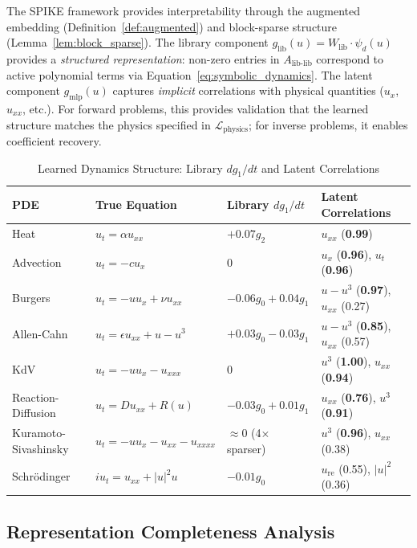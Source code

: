 \documentclass{article}
\theoremstyle{remark}
\begin{document}
The SPIKE framework provides interpretability through the augmented embedding (Definition~\ref{def:augmented}) and block-sparse structure (Lemma~\ref{lem:block_sparse}). The library component $g_{\text{lib}}(u) = W_{\text{lib}} \cdot \psi_d(u)$ provides a \textit{structured representation}: non-zero entries in $A_{\text{lib-lib}}$ correspond to active polynomial terms via Equation~\ref{eq:symbolic_dynamics}. The latent component $g_{\text{mlp}}(u)$ captures \textit{implicit} correlations with physical quantities ($u_x$, $u_{xx}$, etc.). For forward problems, this provides validation that the learned structure matches the physics specified in $\mathcal{L}_{\text{physics}}$; for inverse problems, it enables coefficient recovery.

\begin{table}[H]
\centering
\caption{Learned Dynamics Structure: Library $dg_1/dt$ and Latent Correlations}
\label{tab:learned_dynamics}
\begin{tabular}{llll}
\toprule
PDE & True Equation & Library $dg_1/dt$ & Latent Correlations \\
\midrule
Heat & $u_t = \alpha u_{xx}$ & $+0.07g_2$ & $u_{xx}$ (\textbf{0.99}) \\
Advection & $u_t = -c u_x$ & $0$ & $u_x$ (\textbf{0.96}), $u_t$ (\textbf{0.96}) \\
Burgers & $u_t = -uu_x + \nu u_{xx}$ & $-0.06g_0 + 0.04g_1$ & $u - u^3$ (\textbf{0.97}), $u_{xx}$ (0.27) \\
Allen-Cahn & $u_t = \epsilon u_{xx} + u - u^3$ & $+0.03g_0 - 0.03g_1$ & $u - u^3$ (\textbf{0.85}), $u_{xx}$ (0.57) \\
KdV & $u_t = -uu_x - u_{xxx}$ & $0$ & $u^3$ (\textbf{1.00}), $u_{xx}$ (\textbf{0.94}) \\
Reaction-Diffusion & $u_t = Du_{xx} + R(u)$ & $-0.03g_0 + 0.01g_1$ & $u_{xx}$ (\textbf{0.76}), $u^3$ (\textbf{0.91}) \\
Kuramoto-Sivashinsky & $u_t = -uu_x - u_{xx} - u_{xxxx}$ & $\approx 0$ (4$\times$ sparser) & $u^3$ (\textbf{0.96}), $u_{xx}$ (0.38) \\
Schr\"odinger & $iu_t = u_{xx} + |u|^2 u$ & $-0.01g_0$ & $u_{\text{re}}$ (0.55), $|u|^2$ (0.36) \\
\bottomrule
\end{tabular}
\end{table}

\subsection{Representation Completeness Analysis}
\end{document}
